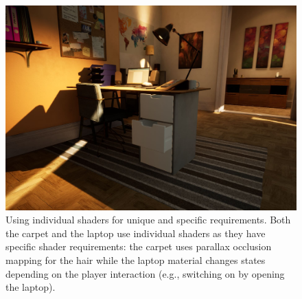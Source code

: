 \begin{figure}
	\centering
	\includegraphics[width=0.7\linewidth]{images/07cha_11_leaRoomCarpet.jpg}
	\caption{Using individual shaders for unique and specific requirements.
		Both the carpet and the laptop use individual shaders as they have specific shader requirements: the carpet uses parallax occlusion mapping for the hair while the laptop material changes states depending on the player interaction (e.g., switching on by opening the laptop).}
	\label{fig:leaRoomCarpet}
\end{figure}

